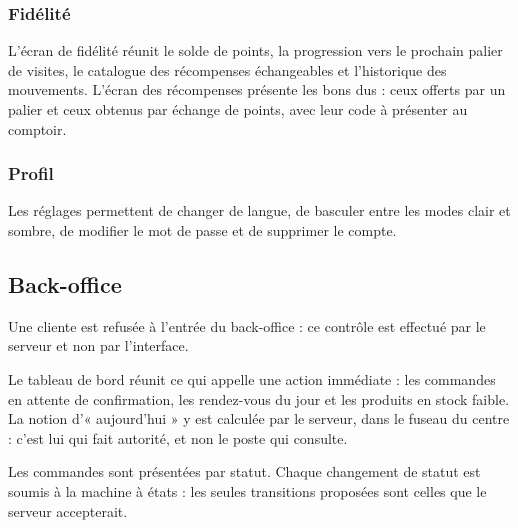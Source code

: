 \subsubsection{Fidélité}


L'écran de fidélité réunit le solde de points, la progression vers le prochain
palier de visites, le catalogue des récompenses échangeables et l'historique
des mouvements. L'écran des récompenses présente les bons dus : ceux offerts
par un palier et ceux obtenus par échange de points, avec leur code à présenter
au comptoir.

\subsubsection{Profil}


Les réglages permettent de changer de langue, de basculer entre les modes clair
et sombre, de modifier le mot de passe et de supprimer le compte.

\subsection{Back-office}


Une cliente est refusée à l'entrée du back-office : ce contrôle est effectué
par le serveur et non par l'interface.


Le tableau de bord réunit ce qui appelle une action immédiate : les commandes
en attente de confirmation, les rendez-vous du jour et les produits en stock
faible. La notion d'« aujourd'hui » y est calculée par le serveur, dans le
fuseau du centre : c'est lui qui fait autorité, et non le poste qui consulte.


Les commandes sont présentées par statut. Chaque changement de statut est
soumis à la machine à états : les seules transitions proposées sont celles que
le serveur accepterait.

